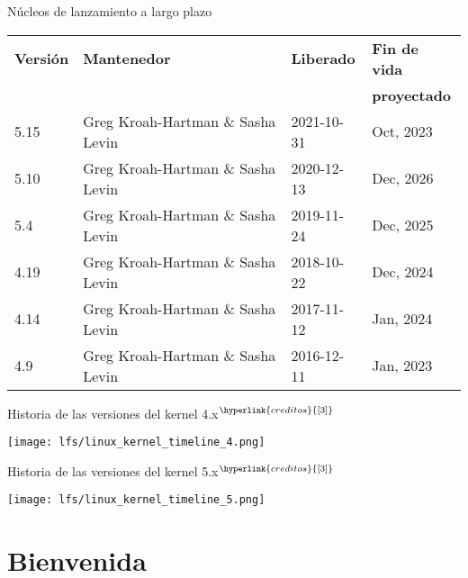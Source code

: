 \begin{frame}[c]{Núcleos de lanzamiento a largo plazo}
  \begin{table}[]
  \begin{tabular}{llll}
    \textbf{Versión} &  \textbf{Mantenedor} & \textbf{Liberado} & \textbf{Fin de vida} \\
     & & & \textbf{proyectado} \\
    \rowcolor{editorGray}
    5.15&Greg Kroah-Hartman \& Sasha Levin 	&2021-10-31 	&Oct, 2023 \\
    5.10&Greg Kroah-Hartman \& Sasha Levin 	&2020-12-13 	&Dec, 2026 \\
    \rowcolor{editorGray}
    5.4&Greg Kroah-Hartman \& Sasha Levin 	&2019-11-24 	&Dec, 2025 \\
    4.19&Greg Kroah-Hartman \& Sasha Levin 	&2018-10-22 	&Dec, 2024 \\
    \rowcolor{editorGray}
    4.14&Greg Kroah-Hartman \& Sasha Levin 	&2017-11-12 	&Jan, 2024 \\
    4.9&Greg Kroah-Hartman \& Sasha Levin 	&2016-12-11 	&Jan, 2023 \\
  \end{tabular}
  \end{table}
\end{frame}

\begin{frame}[c]{Historia de las versiones del kernel 4.x$^{\hyperlink{creditos}{[3]}}$}
  \begin{center}
    \texttt{[image: lfs/linux\_kernel\_timeline\_4.png]}
  \end{center}
\end{frame}

\begin{frame}[c]{Historia de las versiones del kernel 5.x$^{\hyperlink{creditos}{[3]}}$}
  \begin{center}
    \texttt{[image: lfs/linux\_kernel\_timeline\_5.png]}
  \end{center}
\end{frame}

\section{Bienvenida}

